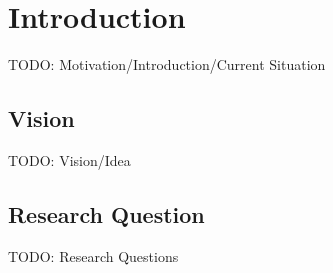 
\chapter{Introduction}
\label{ch:introduction}
TODO: Motivation/Introduction/Current Situation

\section{Vision}
\label{sec:vision}
TODO: Vision/Idea

\section{Research Question}
\label{sec:research_question}
TODO: Research Questions